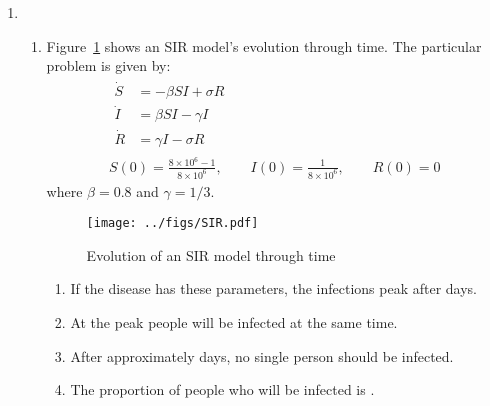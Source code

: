 \documentclass[12pt,a4]{article}
\begin{document}
\begin{enumerate}
\begin{enumerate}
    \end{enumerate}
  \item
    \begin{enumerate}
      \item
        Figure~\ref{fig:SIR} shows an SIR model's evolution through time.
        The particular problem is given by:
        \begin{gather*}
          \begin{split}
            \dot S &= - \beta S I + \sigma R\\
            \dot I &= \beta SI - \gamma I\\
            \dot R &= \gamma I - \sigma R
          \end{split}\\
          S(0) = \frac{8 \times 10 ^ 6 - 1}{8 \times 10^6},\qquad I(0) = \frac{1}{8 \times 10^6}, \qquad R(0) = 0
        \end{gather*}
        where $\beta =  0.8$ and $\gamma = 1 / 3$.
        \begin{figure}[H]
          \centering
          \texttt{[image: ../figs/SIR.pdf]}
          \caption{Evolution of an SIR model through time}
          \label{fig:SIR}
        \end{figure}
        \begin{enumerate}
          \item If the disease has these parameters, the infections peak after  days.
          \item At the peak  people will be infected at the same time.
          \item After approximately  days, no single person should be infected.
          \item The proportion of people who will be infected is .
        \end{enumerate}


\end{enumerate}
\end{enumerate}
\end{document}
